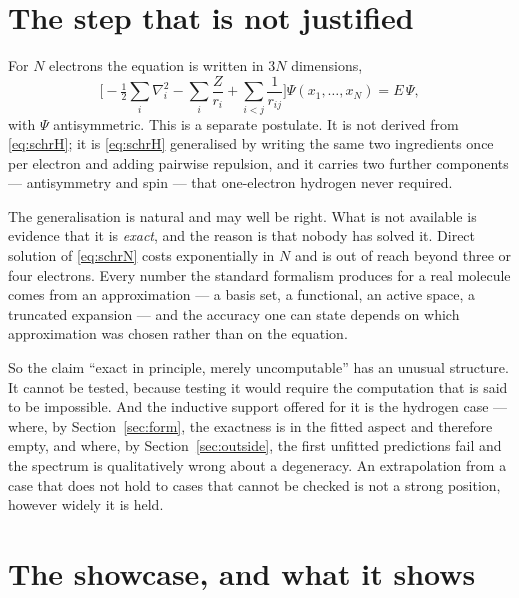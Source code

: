 \documentclass[11pt]{article}
\begin{document}
\section{The step that is not justified}\label{sec:step}

For $N$ electrons the equation is written in $3N$ dimensions,
\begin{equation}
\Big[-\tfrac12\sum_{i}\nabla_i^2 - \sum_i\frac{Z}{r_i} + \sum_{i<j}\frac{1}{r_{ij}}\Big]
\Psi(x_1,\dots,x_N) = E\,\Psi ,
\label{eq:schrN}
\end{equation}
with $\Psi$ antisymmetric. This is a separate postulate. It is not derived from
\eqref{eq:schrH}; it is \eqref{eq:schrH} generalised by writing the same two ingredients once per
electron and adding pairwise repulsion, and it carries two further components ---
antisymmetry and spin --- that one-electron hydrogen never required.

The generalisation is natural and may well be right. What is not available is evidence that it is
\emph{exact}, and the reason is that nobody has solved it. Direct solution of \eqref{eq:schrN}
costs exponentially in $N$ and is out of reach beyond three or four electrons. Every number the
standard formalism produces for a real molecule comes from an approximation --- a basis set, a
functional, an active space, a truncated expansion --- and the accuracy one can state depends on
which approximation was chosen rather than on the equation.

So the claim ``exact in principle, merely uncomputable'' has an unusual structure. It cannot be
tested, because testing it would require the computation that is said to be impossible. And the
inductive support offered for it is the hydrogen case --- where, by Section~\ref{sec:form}, the
exactness is in the fitted aspect and therefore empty, and where, by Section~\ref{sec:outside},
the first unfitted predictions fail and the spectrum is qualitatively wrong about a degeneracy. An extrapolation from a case that does not hold to cases
that cannot be checked is not a strong position, however widely it is held.

\section{The showcase, and what it shows}\label{sec:ae}
\end{document}
